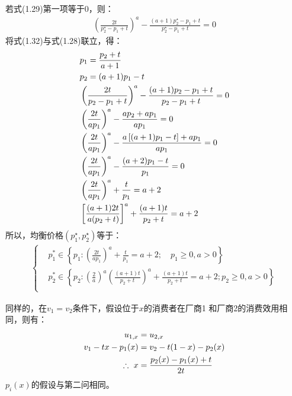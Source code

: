 若式(1.29)第一项等于0，则：
\begin{align}
    (\frac{2t}{p_2^{\star}-p_1+t})^a-\frac{(a+1)p_2^{\star}-p_1+t}{p_2^{\star}-p_1+t} = 0
\end{align}
将式(1.32)与式(1.28)联立，得：
\begin{align}
&p_1=\frac{p_2+t}{a+1}\\
&p_2=(a+1) p_1-t  \\
&\left(\frac{2 t}{p_2-p_1+t}\right)^{a}-\frac{(a+1) p_2-p_1+t}{p_2-p_1+t}=0 \notag\\
&\left(\frac{2 t}{a p_1}\right)^a-\frac{a p_2+a p_1}{a p_1}=0 \notag\\
&\left(\frac{2 t}{a p_1}\right)^a-\frac{a\left[(a+1) p_1-t\right]+a p_1}{a p_1}=0\notag\\
&\left(\frac{2 t}{a p_1}\right)^a-\frac{(a+2) p_1-t}{p_1}=0\notag\\
&\left(\frac{2 t}{a p_1}\right)^a+\frac{t}{p_1}=a+2 \notag\\
&\left[\frac{(a+1) 2 t}{\left.a (p_2+t\right)}\right]^a+\frac{(a+1) t}{p_2+t}=a+2 
\end{align}
所以，均衡价格$(p_1^{\star},p_2^{\star})$等于：
\begin{align}
    \begin{cases}
    & p_1^* \in\left\{p_1:\left(\frac{2 t}{a p_1}\right)^a+\frac{t}{p_1}=a+2 ; \quad p_1 \geqslant 0, a>0\right\} \\
     &p_2^* \in\left\{p_2:\left(\frac{2}{a}\right)^a\left(\frac{(a+1) t}{p_2+t}\right)^a+\frac{(a+1) t}{p_2+t}=a+2 ; p_2\geqslant 0, a>0\right\}\\
    \end{cases}
\end{align}

\qsubpart
同样的，在$v_1=v_2$条件下，假设位于$x$的消费者在厂商1 和厂商2的消费效用相同，则有：
\begin{align}
     u_{1,x}&=u_{2,x} \notag \\ 
     v_1-tx-p_1(x) &= v_2-t(1-x)-p_2(x) \notag \\
     \therefore \  x &= \frac{p_2(x)-p_1(x)+t}{2t}
\end{align}
$p_i(x)$的假设与第二问相同。


